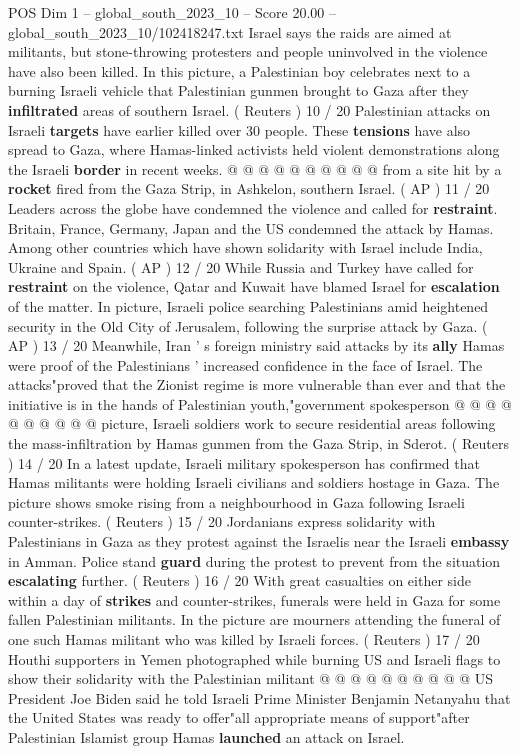 \begin{textsample}{POS Dim 1 – global\_south\_2023\_10 – Score 20.00 – global\_south\_2023\_10/102418247.txt}
Israel says the raids are aimed at militants, but stone-throwing protesters and people uninvolved in the violence have also been killed.
In this picture, a Palestinian boy celebrates next to a burning Israeli vehicle that Palestinian gunmen brought to Gaza after they \textbf{infiltrated} areas of southern Israel. ( Reuters ) 10 / 20 Palestinian attacks on Israeli \textbf{targets} have earlier killed over 30 people.
These \textbf{tensions} have also spread to Gaza, where Hamas-linked activists held violent demonstrations along the Israeli \textbf{border} in recent weeks. @ @ @ @ @ @ @ @ @ @ from a site hit by a \textbf{rocket} fired from the Gaza Strip, in Ashkelon, southern Israel. ( AP ) 11 / 20 Leaders across the globe have condemned the violence and called for \textbf{restraint}.
Britain, France, Germany, Japan and the US condemned the attack by Hamas.
Among other countries which have shown solidarity with Israel include India, Ukraine and Spain. ( AP ) 12 / 20 While Russia and Turkey have called for \textbf{restraint} on the violence, Qatar and Kuwait have blamed Israel for \textbf{escalation} of the matter.
In picture, Israeli police searching Palestinians amid heightened security in the Old City of Jerusalem, following the surprise attack by Gaza. ( AP ) 13 / 20 Meanwhile, Iran ' s foreign ministry said attacks by its \textbf{ally} Hamas were proof of the Palestinians ' increased confidence in the face of Israel.
The attacks"proved that the Zionist regime is more vulnerable than ever and that the initiative is in the hands of Palestinian youth,"government spokesperson @ @ @ @ @ @ @ @ @ @ picture, Israeli soldiers work to secure residential areas following the mass-infiltration by Hamas gunmen from the Gaza Strip, in Sderot. ( Reuters ) 14 / 20 In a latest update, Israeli military spokesperson has confirmed that Hamas militants were holding Israeli civilians and soldiers hostage in Gaza.
The picture shows smoke rising from a neighbourhood in Gaza following Israeli counter-strikes. ( Reuters ) 15 / 20 Jordanians express solidarity with Palestinians in Gaza as they protest against the Israelis near the Israeli \textbf{embassy} in Amman.
Police stand \textbf{guard} during the protest to prevent from the situation \textbf{escalating} further. ( Reuters ) 16 / 20 With great casualties on either side within a day of \textbf{strikes} and counter-strikes, funerals were held in Gaza for some fallen Palestinian militants.
In the picture are mourners attending the funeral of one such Hamas militant who was killed by Israeli forces. ( Reuters ) 17 / 20 Houthi supporters in Yemen photographed while burning US and Israeli flags to show their solidarity with the Palestinian militant @ @ @ @ @ @ @ @ @ @ US President Joe Biden said he told Israeli Prime Minister Benjamin Netanyahu that the United States was ready to offer"all appropriate means of support"after Palestinian Islamist group Hamas \textbf{launched} an attack on Israel.

\end{textsample}
